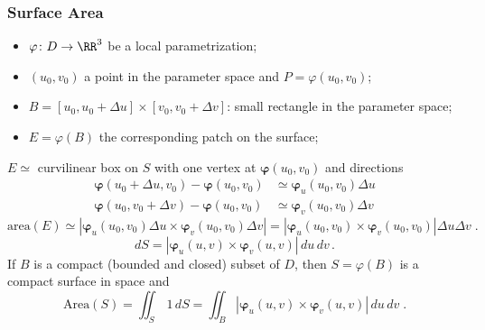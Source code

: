 \begin{frame}
  \frametitle{Surface Area}

\begin{itemize}
  \item $\varphi \colon D \to \RR^3$ be a local parametrization;
  \item $(u_0,v_0)$ a point in the parameter space and $P = \varphi(u_0,v_0)$;
  \item $B = [u_0,u_0 + \Delta u] \times [v_0,v_0+\Delta v]$: small rectangle in the parameter space;
  \item $E=\varphi(B)$ the corresponding patch on the surface;
\end{itemize}

\pause
$E \simeq$ curvilinear box on $S$ with one vertex at $\bm{\varphi}(u_0,v_0)$ and directions
%
\begin{align*}
  \bm{\varphi}(u_0+\Delta u,v_0) - \bm{\varphi}(u_0,v_0) & \simeq  \bm{\varphi}_u (u_0,v_0) \Delta u \\
  \bm{\varphi}(u_0,v_0+\Delta v) - \bm{\varphi}(u_0,v_0) & \simeq  \bm{\varphi}_v (u_0,v_0) \Delta v
\end{align*}
%
$$\text{area}(E) \simeq |\bm{\varphi}_u(u_0,v_0) \Delta u \times \bm{\varphi}_v(u_0,v_0)\Delta v| = |\bm{\varphi}_u(u_0,v_0) \times \bm{\varphi}_v(u_0,v_0)| \Delta u \Delta v\; .$$
%
$$dS = |\bm{\varphi}_u(u,v) \times \bm{\varphi}_v(u,v)| \, du\, dv\, .$$
%
\pause If $B$ is a compact (bounded and closed) subset of $D$, then $S=\varphi(B)$ is a compact surface in space and
%
$$\text{Area}(S) = \iint_{S} \, 1\,dS = \iint_B |\bm{\varphi}_u(u,v) \times \bm{\varphi}_v(u,v)| \, du\, dv\; .$$
%
\end{frame}
